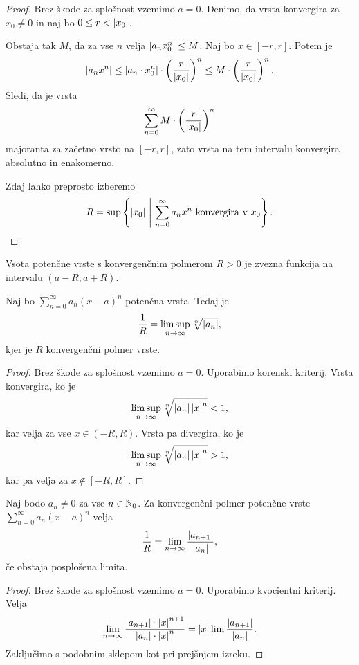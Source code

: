 \documentclass[12pt, a4paper]{article}
\begin{document}
\begin{proof}
Brez škode za splošnost vzemimo $a=0$. Denimo, da vrsta konvergira za $x_0\ne 0$ in naj bo $0\leq r<\left\lvert x_0\right\rvert$.

Obstaja tak $M$, da za vse $n$ velja $\left\lvert a_nx_0^n\right\rvert\leq M$. Naj bo $x\in[-r,r]$. Potem je
\[
\left\lvert a_nx^n\right\rvert\leq\left\lvert a_n\cdot x_0^n\right\rvert\cdot\left(\frac{r}{\left\lvert x_0\right\rvert}\right)^n\leq M\cdot\left(\frac{r}{\left\lvert x_0\right\rvert}\right)^n.
\]
Sledi, da je vrsta
\[
\sum_{n=0}^\infty M\cdot\left(\frac{r}{\left\lvert x_0\right\rvert}\right)^n
\]
majoranta za začetno vrsto na $[-r,r]$, zato vrsta na tem intervalu konvergira absolutno in enakomerno.

Zdaj lahko preprosto izberemo
\[
R=\sup\left\{\left\lvert x_0\right\rvert~\middle\vert~\sum_{n=0}^\infty a_nx^n~\text{konvergira v}~x_0\right\}.\qedhere
\]
\end{proof}

\begin{posledica}
Vsota potenčne vrste s konvergenčnim polmerom $R>0$ je zvezna funkcija na intervalu $(a-R,a+R)$.
\end{posledica}

\begin{izrek}
Naj bo $\displaystyle\sum_{n=0}^\infty a_n(x-a)^n$ potenčna vrsta. Tedaj je
\[
\frac{1}{R}=\limsup_{n\to\infty}\sqrt[n]{\left\lvert a_n\right\rvert},
\]
kjer je $R$ konvergenčni polmer vrste.
\end{izrek}

\begin{proof}
Brez škode za splošnost vzemimo $a=0$. Uporabimo korenski kriterij. Vrsta konvergira, ko je
\[
\limsup_{n\to\infty}\sqrt[n]{\left\lvert a_n\right\rvert\left\lvert x\right\rvert^n}<1,
\]
kar velja za vse $x\in(-R,R)$. Vrsta pa divergira, ko je
\[
\limsup_{n\to\infty}\sqrt[n]{\left\lvert a_n\right\rvert\left\lvert x\right\rvert^n}>1,
\]
kar pa velja za $x\not\in[-R,R]$.
\end{proof}

\begin{trditev}
Naj bodo $a_n\ne 0$ za vse $n\in\mathbb{N}_0$. Za konvergenčni polmer potenčne vrste $\displaystyle\sum_{n=0}^\infty a_n(x-a)^n$ velja
\[
\frac{1}{R}=\lim_{n\to\infty}\frac{\left\lvert a_{n+1}\right\rvert}{\left\lvert a_n\right\rvert},
\]
če obstaja posplošena limita.
\end{trditev}

\begin{proof}
Brez škode za splošnost vzemimo $a=0$. Uporabimo kvocientni kriterij. Velja
\[
\lim_{n\to\infty}\frac{\left\lvert a_{n+1}\right\rvert\cdot\left\lvert x\right\rvert^{n+1}}{\left\lvert a_n\right\rvert\cdot\left\lvert x\right\rvert^n}=\left\lvert x\right\rvert\lim\frac{\left\lvert a_{n+1}\right\rvert}{\left\lvert a_n\right\rvert}.
\]
Zaključimo s podobnim sklepom kot pri prejšnjem izreku.
\end{proof}
\end{document}
